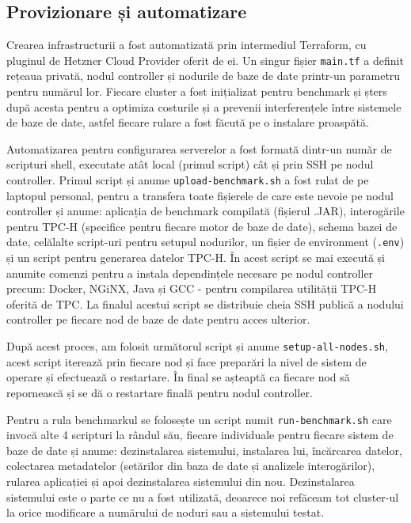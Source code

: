 \subsection{Provizionare și automatizare}

Crearea infrastructurii a fost automatizată prin intermediul Terraform, cu pluginul de Hetzner Cloud Provider oferit de ei. Un singur fișier \texttt{main.tf} a definit rețeaua privată, nodul controller și nodurile de baze de date printr-un parametru pentru numărul lor. Fiecare cluster a fost inițializat pentru benchmark și șters după acesta pentru a optimiza costurile și a prevenii interferențele între sistemele de baze de date, astfel fiecare rulare a fost făcută pe o instalare proaspătă.

Automatizarea pentru configurarea serverelor a fost formată dintr-un număr de scripturi shell, executate atât local (primul script) cât și prin SSH pe nodul controller. Primul script și anume \texttt{upload-benchmark.sh} a fost rulat de pe laptopul personal, pentru a transfera toate fișierele de care este nevoie pe nodul controller și anume: aplicația de benchmark compilată (fișierul .JAR), interogările pentru TPC-H (specifice pentru fiecare motor de baze de date), schema bazei de date, celălalte script-uri pentru setupul nodurilor, un fișier de environment (\texttt{.env}) și un script pentru generarea datelor TPC-H. În acest script se mai execută și anumite comenzi pentru a instala dependințele necesare pe nodul controller precum: Docker, NGiNX, Java și GCC - pentru compilarea utilității TPC-H oferită de TPC. La finalul acestui script se distribuie cheia SSH publică a nodului controller pe fiecare nod de baze de date pentru acces ulterior.

După acest proces, am folosit următorul script și anume \texttt{setup-all-nodes.sh}, acest script iterează prin fiecare nod și face preparări la nivel de sistem de operare și efectuează o restartare. În final se așteaptă ca fiecare nod să repornească și se dă o restartare finală pentru nodul controller.

Pentru a rula benchmarkul se folosește un script numit \texttt{run-benchmark.sh} care invocă alte 4 scripturi la rândul său, fiecare individuale pentru fiecare sistem de baze de date și anume: dezinstalarea sistemului, instalarea lui, încărcarea datelor, colectarea metadatelor (setărilor din baza de date și analizele interogărilor), rularea aplicației și apoi dezinstalarea sistemului din nou. Dezinstalarea sistemului este o parte ce nu a fost utilizată, deoarece noi refăceam tot cluster-ul la orice modificare a numărului de noduri sau a sistemului testat.

